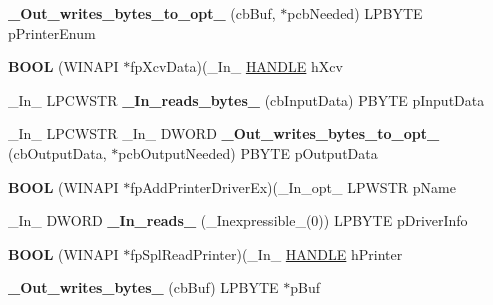 \begin{DoxyCompactItemize}
{\bfseries \+\_\+\+Out\+\_\+writes\+\_\+bytes\+\_\+to\+\_\+opt\+\_\+} (cb\+Buf, $\ast$pcb\+Needed) L\+P\+B\+Y\+TE p\+Printer\+Enum
\item 
\mbox{\label{struct___p_r_i_n_t_p_r_o_v_i_d_o_r_af6555726f7220c766deaea924827b471}} 
{\bfseries B\+O\+OL} (W\+I\+N\+A\+PI $\ast$fp\+Xcv\+Data)(\+\_\+\+In\+\_\+ \hyperlink{interfacevoid}{H\+A\+N\+D\+LE} h\+Xcv
\item 
\mbox{\label{struct___p_r_i_n_t_p_r_o_v_i_d_o_r_a2c13a225e4436d21a7137ee30e7a7791}} 
\+\_\+\+In\+\_\+ L\+P\+C\+W\+S\+TR {\bfseries \+\_\+\+In\+\_\+reads\+\_\+bytes\+\_\+} (cb\+Input\+Data) P\+B\+Y\+TE p\+Input\+Data
\item 
\mbox{\label{struct___p_r_i_n_t_p_r_o_v_i_d_o_r_aa585d7d596f9aaee3ac302bac3e7ebdf}} 
\+\_\+\+In\+\_\+ L\+P\+C\+W\+S\+TR \+\_\+\+In\+\_\+ D\+W\+O\+RD {\bfseries \+\_\+\+Out\+\_\+writes\+\_\+bytes\+\_\+to\+\_\+opt\+\_\+} (cb\+Output\+Data, $\ast$pcb\+Output\+Needed) P\+B\+Y\+TE p\+Output\+Data
\item 
\mbox{\label{struct___p_r_i_n_t_p_r_o_v_i_d_o_r_a14852752a620568d02bb125ac1141f4b}} 
{\bfseries B\+O\+OL} (W\+I\+N\+A\+PI $\ast$fp\+Add\+Printer\+Driver\+Ex)(\+\_\+\+In\+\_\+opt\+\_\+ L\+P\+W\+S\+TR p\+Name
\item 
\mbox{\label{struct___p_r_i_n_t_p_r_o_v_i_d_o_r_a869bf8f55a39fdd7fd8b12f162884d89}} 
\+\_\+\+In\+\_\+ D\+W\+O\+RD {\bfseries \+\_\+\+In\+\_\+reads\+\_\+} (\+\_\+\+Inexpressible\+\_\+(0)) L\+P\+B\+Y\+TE p\+Driver\+Info
\item 
\mbox{\label{struct___p_r_i_n_t_p_r_o_v_i_d_o_r_a7a783e12e6f8b8677ce73e19c6fb4d8f}} 
{\bfseries B\+O\+OL} (W\+I\+N\+A\+PI $\ast$fp\+Spl\+Read\+Printer)(\+\_\+\+In\+\_\+ \hyperlink{interfacevoid}{H\+A\+N\+D\+LE} h\+Printer
\item 
\mbox{\label{struct___p_r_i_n_t_p_r_o_v_i_d_o_r_a61de95a53526279905799083836ecf22}} 
{\bfseries \+\_\+\+Out\+\_\+writes\+\_\+bytes\+\_\+} (cb\+Buf) L\+P\+B\+Y\+TE $\ast$p\+Buf
\item 

\end{DoxyCompactItemize}
